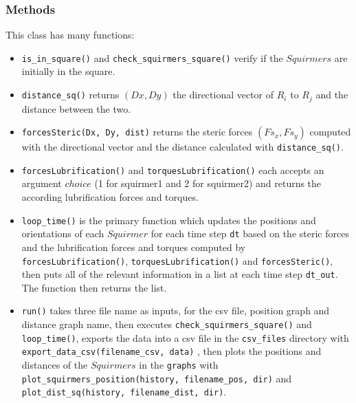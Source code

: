 \documentclass{article}
\begin{document}
\subsubsection*{Methods}
This class has many functions:
\begin{itemize}
   \item \texttt{is\_in\_square()} and \texttt{check\_squirmers\_square()} verify if the $Squirmers$ 
    are initially in the square.
   \item \texttt{distance\_sq()} returns $(Dx, Dy)$ the directional vector of $R_{i}$ to $R_{j}$ 
   and the distance between the two.
   \item \texttt{forcesSteric(Dx, Dy, dist)} returns the steric forces $(Fs_x, Fs_y)$ computed with the directional vector and the distance calculated with \texttt{distance\_sq()}.
   \item \texttt{forcesLubrification()} and \texttt{torquesLubrification()} each accepts an argument $choice$ (1 for squirmer1 and 2 for squirmer2)
   and returns the according lubrification forces and torques.
   \item \texttt{loop\_time()} is the primary function which updates the positions and orientations of each $Squirmer$
   for each time step \texttt{dt} based on the steric forces and the lubrification forces and torques computed by \texttt{forcesLubrification()}, 
   \texttt{torquesLubrification()} and \texttt{forcesSteric()}, then puts all of the relevant information in a list
   at each time step \texttt{dt\_out}. The function then returns the list.
   \item \texttt{run()} takes three file name as inputs, for the csv file, position graph and distance graph name, 
   then executes \texttt{check\_squirmers\_square()} and \texttt{loop\_time()},
   exports the data into a csv file in the \texttt{csv\_files} directory with \texttt{export\_data\_csv(filename\_csv, data)} 
   , then plots the positions and distances of the $Squirmers$ in the \texttt{graphs} with \texttt{plot\_squirmers\_position(history, filename\_pos, dir)}
   and \texttt{plot\_dist\_sq(history, filename\_dist, dir)}.
\end{itemize}
\end{document}
